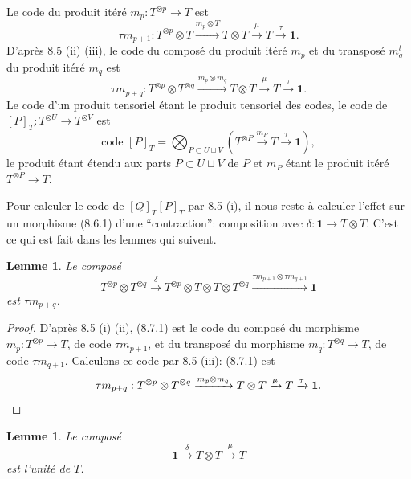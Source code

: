 \documentclass[11pt,a4paper]{article}
\theoremstyle{plain}
\newtheorem{lemma}[theorem]{Lemme}
\theoremstyle{definition}
\begin{document}
Le code du produit it\'er\'e $m_p : T^{\otimes p} \to T$ est
\[
\tau m_{p+1} : T^{\otimes p} \otimes T \xrightarrow{m_p \otimes T} T \otimes T \xrightarrow{\mu} T \xrightarrow{\tau} \mathbf{1}.
\]
D'apr\`es 8.5 (ii) (iii), le code du compos\'e du produit it\'er\'e $m_p$ et du transpos\'e $m_q^t$ du produit it\'er\'e $m_q$ est
\[
\tau m_{p+q} : T^{\otimes p} \otimes T^{\otimes q} \xrightarrow{m_p \otimes m_q} T \otimes T \xrightarrow{\mu} T \xrightarrow{\tau} \mathbf{1}.
\]
Le code d'un produit tensoriel \'etant le produit tensoriel des codes, le code de $[P]_T : T^{\otimes U} \to T^{\otimes V}$ est
\begin{equation}
\text{code } [P]_T = \bigotimes_{P \subset U \sqcup V} (T^{\otimes P} \xrightarrow{m_P} T \xrightarrow{\tau} \mathbf{1}), \tag{8.6.1}
\end{equation}
le produit \'etant \'etendu aux parts $P \subset U \sqcup V$ de $P$ et $m_P$ \'etant le produit it\'er\'e $T^{\otimes P} \to T$.

Pour calculer le code de $[Q]_T [P]_T$ par 8.5 (i), il nous reste \`a calculer l'effet sur un morphisme (8.6.1) d'une ``contraction'': composition avec $\delta : \mathbf{1} \to T \otimes T$. C'est ce qui est fait dans les lemmes qui suivent.

\begin{lemma}
Le compos\'e
\begin{equation}
T^{\otimes p} \otimes T^{\otimes q} \xrightarrow{\delta} T^{\otimes p} \otimes T \otimes T \otimes T^{\otimes q} \xrightarrow{\tau m_{p+1} \otimes \tau m_{q+1}} \mathbf{1} \tag{8.7.1}
\end{equation}
est $\tau m_{p+q}$.
\end{lemma}

\begin{proof}
D'apr\`es 8.5 (i) (ii), (8.7.1) est le code du compos\'e du morphisme $m_p : T^{\otimes p} \to T$, de code $\tau m_{p+1}$, et du transpos\'e du morphisme $m_q : T^{\otimes q} \to T$, de code $\tau m_{q+1}$. Calculons ce code par 8.5 (iii): (8.7.1) est
\[
\tau m_{p+q} : T^{\otimes p} \otimes T^{\otimes q} \xrightarrow{m_p \otimes m_q} T \otimes T \xrightarrow{\mu} T \xrightarrow{\tau} \mathbf{1}. \qedhere
\]
\end{proof}

\begin{lemma}
Le compos\'e
\[
\mathbf{1} \xrightarrow{\delta} T \otimes T \xrightarrow{\mu} T
\]
est l'unit\'e de $T$.
\end{lemma}
\end{document}
